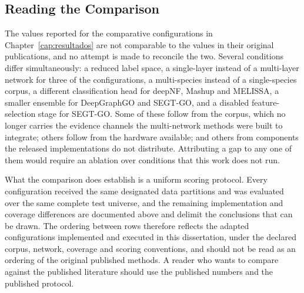 \documentclass[Ingles]{ic-tese-v3}
\begin{document}
\begin{appendices}{}
\section{Reading the Comparison}
\label{ape:discrepancias}

The values reported for the comparative configurations in Chapter~\ref{cap:resultados} are not
comparable to the values in their original publications, and no attempt is made to reconcile the two.
Several conditions differ simultaneously: a reduced label space, a single-layer instead of a
multi-layer network for three of the configurations, a multi-species instead of a single-species
corpus, a different classification head for deepNF, Mashup and MELISSA, a smaller ensemble for
DeepGraphGO and SEGT-GO, and a disabled feature-selection stage for SEGT-GO. Some of these follow
from the corpus, which no longer carries the evidence channels the multi-network methods were built
to integrate; others follow from the hardware available; and others from components the released
implementations do not distribute. Attributing a gap to any one of them would require an ablation
over conditions that this work does not run.

What the comparison does establish is a uniform scoring protocol. Every configuration received the
same designated data partitions and was evaluated over the same complete test universe, and the
remaining implementation and coverage differences are documented above and delimit the conclusions
that can be drawn. The ordering between rows therefore reflects the adapted configurations
implemented and executed in this dissertation, under the declared corpus, network, coverage and
scoring conventions, and should not be read as an ordering of the original published methods. A
reader who wants to compare against the published literature should use the published numbers and
the published protocol.

\end{appendices}
\end{document}
